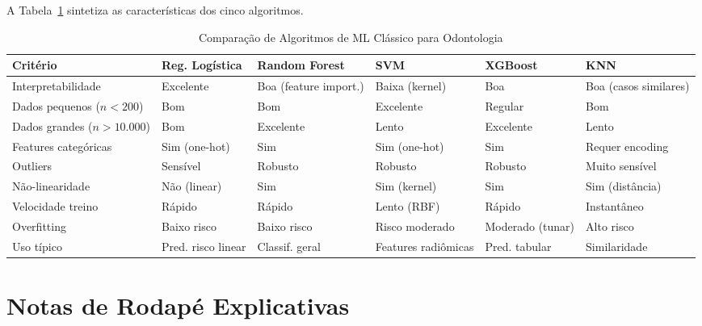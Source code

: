 A Tabela~\ref{tab:comparacao-ml} sintetiza as características dos cinco algoritmos.

\begin{table}[H]
  \centering
  \caption{Comparação de Algoritmos de ML Clássico para Odontologia}
  \label{tab:comparacao-ml}
  \small
  \begin{tabularx}{\textwidth}{p{2cm}XXXXX}
    \toprule
    \textbf{Critério} & \textbf{Reg. Logística} & \textbf{Random Forest} & \textbf{SVM} & \textbf{XGBoost} & \textbf{KNN} \\
    \midrule
    Interpretabilidade & Excelente & Boa (feature import.) & Baixa (kernel) & Boa & Boa (casos similares) \\
    Dados pequenos ($n<200$) & Bom & Bom & Excelente & Regular & Bom \\
    Dados grandes ($n>10.000$) & Bom & Excelente & Lento & Excelente & Lento \\
    Features categóricas & Sim (one-hot) & Sim & Sim (one-hot) & Sim & Requer encoding \\
    Outliers & Sensível & Robusto & Robusto & Robusto & Muito sensível \\
    Não-linearidade & Não (linear) & Sim & Sim (kernel) & Sim & Sim (distância) \\
    Velocidade treino & Rápido & Rápido & Lento (RBF) & Rápido & Instantâneo \\
    Overfitting & Baixo risco & Baixo risco & Risco moderado & Moderado (tunar) & Alto risco \\
    Uso típico & Pred. risco linear & Classif. geral & Features radiômicas & Pred. tabular & Similaridade \\
    \bottomrule
  \end{tabularx}
\end{table}

\section{Notas de Rodapé Explicativas}


